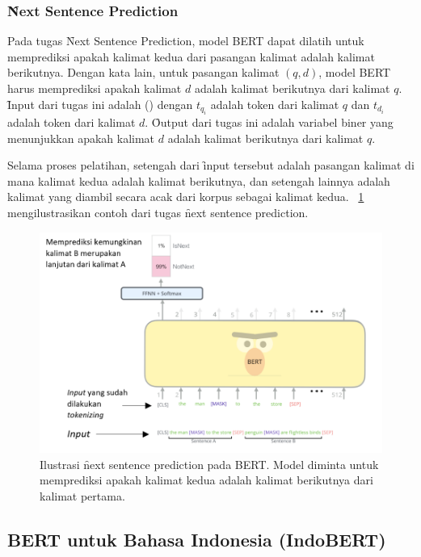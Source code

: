 	\subsubsection{\f{Next Sentence Prediction}}
	\label{sec:next-sentence-prediction}

	Pada tugas \f{Next Sentence Prediction}, model BERT dapat dilatih untuk memprediksi apakah kalimat kedua dari pasangan kalimat adalah kalimat berikutnya. Dengan kata lain, untuk pasangan kalimat $(q, d)$, model BERT harus memprediksi apakah kalimat $d$ adalah kalimat berikutnya dari kalimat $q$. \f{Input} dari tugas ini adalah () dengan $t_{q_i}$ adalah token dari kalimat $q$ dan $t_{d_i}$ adalah token dari kalimat $d$. \f{Output} dari tugas ini adalah variabel biner yang menunjukkan apakah kalimat $d$ adalah kalimat berikutnya dari kalimat $q$.
	
	Selama proses pelatihan, setengah dari \f{input} tersebut adalah pasangan kalimat di mana kalimat kedua adalah kalimat berikutnya, dan setengah lainnya adalah kalimat yang diambil secara acak dari korpus sebagai kalimat kedua. \pic~\ref{fig:next-sentence-prediction} mengilustrasikan contoh dari tugas \f{next sentence prediction}.

	\begin{figure}
		\centering
		\includegraphics[width=1\textwidth]{assets/pics/Paste.png}
		\caption{Ilustrasi \f{next sentence prediction} pada BERT. Model diminta untuk memprediksi apakah kalimat kedua adalah kalimat berikutnya dari kalimat pertama.}
		\label{fig:next-sentence-prediction}
	\end{figure}

	
	\subsection{BERT untuk Bahasa Indonesia (IndoBERT)}

